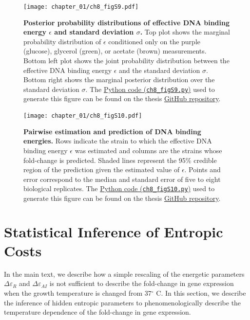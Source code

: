 \documentclass[12pt]{caltech_thesis}
\begin{document}
\hypertarget{fig:carbon_cornerplot}{%
\begin{figure}
\centering
\texttt{[image: chapter\_01/ch8\_figS9.pdf]}
\caption[{Posterior probability distributions of effective DNA binding
and standard deviation for different carbon sources.}]{\textbf{Posterior
probability distributions of effective DNA binding energy \(\epsilon\)
and standard deviation \(\sigma\).} Top plot shows the marginal
probability distribution of \(\epsilon\) conditioned only on the purple
(glucose), glycerol (green), or acetate (brown) measurements. Bottom
left plot shows the joint probability distribution between the effective
DNA binding energy \(\epsilon\) and the standard deviation \(\sigma\).
Bottom right shows the marginal posterior distribution over the standard
deviation \(\sigma\). The
\href{https://github.com/gchure/phd/blob/master/src/chapter_08/code/ch8_figS9.py}{Python
code (\texttt{ch8\_figS9.py})} used to generate this figure can be found
on the thesis \href{https://github.com/gchure/phd}{GitHub repository}.}
\label{fig:carbon_cornerplot}
\end{figure}
}

\hypertarget{fig:pairwise_carbon}{%
\begin{figure}
\centering
\texttt{[image: chapter\_01/ch8\_figS10.pdf]}
\caption[{Pairwise estimation and prediction of DNA binding energies
estimated from different carbon sources.}]{\textbf{Pairwise estimation
and prediction of DNA binding energies.} Rows indicate the strain to
which the effective DNA binding energy \(\epsilon\) was estimated and
columns are the strains whose fold-change is predicted. Shaded lines
represent the 95\% credible region of the prediction given the estimated
value of \(\epsilon\). Points and error correspond to the median and
standard error of five to eight biological replicates. The
\href{https://github.com/gchure/phd/blob/master/src/chapter_08/code/ch8_figS10.py}{Python
code (\texttt{ch8\_figS10.py})} used to generate this figure can be
found on the thesis \href{https://github.com/gchure/phd}{GitHub
repository}.}
\label{fig:pairwise_carbon}
\end{figure}
}

\hypertarget{statistical-inference-of-entropic-costs}{%
\section{Statistical Inference of Entropic
Costs}\label{statistical-inference-of-entropic-costs}}

In the main text, we describe how a simple rescaling of the energetic
parameters \(\Delta\varepsilon_R\) and \(\Delta\varepsilon_{AI}\) is not
sufficient to describe the fold-change in gene expression when the
growth temperature is changed from 37\(^\circ\) C. In this section, we
describe the inference of hidden entropic parameters to
phenomenologically describe the temperature dependence of the
fold-change in gene expression.
\end{document}
